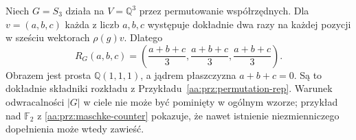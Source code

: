 \begin{przyklad}
\label{aa:prz:reynolds-permutation}
Niech $G=S_3$ działa na $V=\mathbb Q^3$ przez permutowanie
współrzędnych. Dla $v=(a,b,c)$ każda z liczb $a,b,c$
występuje dokładnie dwa razy na każdej pozycji w sześciu
wektorach $\rho(g)v$. Dlatego
\[
R_G(a,b,c)=\left(\frac{a+b+c}{3},\frac{a+b+c}{3},
\frac{a+b+c}{3}\right).
\]
Obrazem jest prosta $\mathbb Q(1,1,1)$, a jądrem płaszczyzna
$a+b+c=0$. Są to dokładnie składniki rozkładu z
Przykładu~\ref{aa:prz:permutation-rep}. Warunek odwracalności
$|G|$ w ciele nie może być pominięty w ogólnym wzorze;
przykład nad $\mathbb F_2$ z
\ref{aa:prz:maschke-counter} pokazuje, że nawet istnienie
niezmienniczego dopełnienia może wtedy zawieść.
\end{przyklad}
